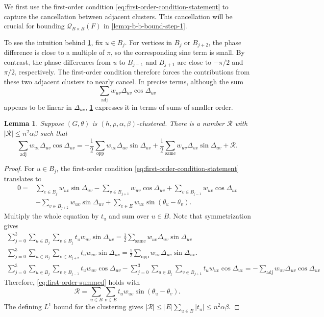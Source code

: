 \documentclass[reqno,11pt]{amsart}
\newtheorem{lemma}{Lemma}
\theoremstyle{definition}
\newcommand{\cQ}{\mathcal{Q}}
\newcommand{\abs}[1]{\left\lvert #1\right\rvert}
\begin{document}
We first use the first-order condition \eqref{eq:first-order-condition-statement} to capture the cancellation between adjacent clusters. This cancellation will be crucial for bounding $\cQ_{B \times B}(F)$ in \cref{lem:q-b-b-bound-step-1}. 

To see the intuition behind \cref{lem:first-order-condition}, fix \(u\in B_j\). For vertices in \(B_j\) or \(B_{j+2}\), the phase difference is close to a multiple of \(\pi\), so the corresponding sine term is small. By contrast, the phase differences from \(u\) to \(B_{j-1}\) and \(B_{j+1}\) are close to \(-\pi/2\) and \(\pi/2\), respectively. The first-order condition therefore forces the contributions from these two adjacent clusters to nearly cancel. In precise terms, although the sum
\[
\sum_{\mathrm{adj}}w_{uv}\Delta_{uv}\cos\Delta_{uv}
\]
appears to be linear in \(\Delta_{uv}\), \cref{lem:first-order-condition} expresses it in terms of sums of smaller order. 

\begin{lemma}\label{lem:first-order-condition}
Suppose $(G,\theta)$ is $(h,\rho,\alpha,\beta)$-clustered.  There is a
number $\mathcal R$ with $\abs{\mathcal R}\le n^2\alpha\beta$ such that
\begin{equation}\label{eq:first-order-summed}
\sum_{\mathrm{adj}}w_{uv}\Delta_{uv}\cos\Delta_{uv}=
-\frac12\sum_{\mathrm{opp}}w_{uv}\Delta_{uv}\sin\Delta_{uv}+\frac12\sum_{\mathrm{same}}w_{uv}\Delta_{uv}\sin\Delta_{uv}
+\mathcal R.
\end{equation}
\end{lemma}

\begin{proof}
For $u\in B_j$, the first-order condition \eqref{eq:first-order-condition-statement} translates to
\begin{align*}
0=&\sum_{v\in B_j}w_{uv}\sin\Delta_{uv}
-\sum_{v\in B_{j+1}}w_{uv}\cos\Delta_{uv}
+\sum_{v\in B_{j-1}}w_{uv}\cos\Delta_{uv}\\
&-\sum_{v\in B_{j+2}}w_{uv}\sin\Delta_{uv}
+\sum_{v\in E}w_{uv}\sin(\theta_u-\theta_v).
\end{align*}
Multiply the whole equation by $t_u$ and sum over $u\in B$. Note that symmetrization gives 
\begin{gather*}
\sum_{j = 0}^3\sum_{u\in B_j}\sum_{v\in B_j}t_uw_{uv}\sin\Delta_{uv}
=\frac12\sum_{\mathrm{same}}
  w_{uv}\Delta_{uv}\sin\Delta_{uv} \\
    \sum_{j = 0}^3\sum_{u\in B_j}\sum_{v\in B_{j+2}}
t_uw_{uv}\sin\Delta_{uv}
=\frac12\sum_{\mathrm{opp}}
  w_{uv}\Delta_{uv}\sin\Delta_{uv}. \\ 
   \sum_{j = 0}^3\sum_{u\in B_j }\sum_{v\in B_{j-1}} t_uw_{uv}\cos\Delta_{uv} -  \sum_{j = 0}^3\sum_{u\in B_j }\sum_{v\in B_{j+1}} t_uw_{uv}\cos\Delta_{uv}
=-\sum_{\mathrm{adj}}w_{uv}\Delta_{uv}\cos\Delta_{uv}
\end{gather*}
Therefore, \eqref{eq:first-order-summed} holds with
\[
    \mathcal R=\sum_{u\in B}\sum_{v\in E}
       t_uw_{uv}\sin(\theta_u-\theta_v).
\]
The defining $L^1$ bound for the clustering gives
$\abs{\mathcal R}\le\abs E\sum_{u\in B}\abs{t_u}\le n^2\alpha\beta$.
\end{proof}
\end{document}
